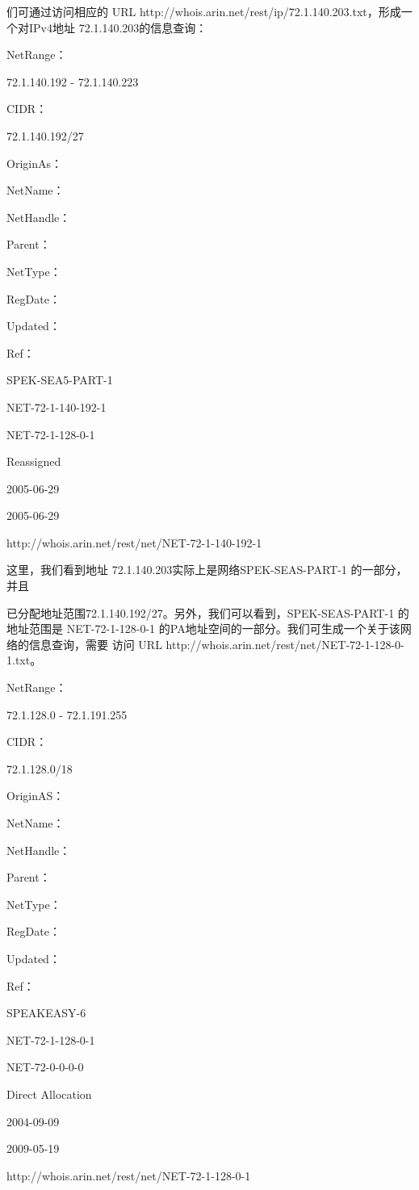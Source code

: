 们可通过访问相应的 URL http://whois.arin.net/rest/ip/72.1.140.203.txt，形成一个对IPv4地址
72.1.140.203的信息查询：

NetRange：

72.1.140.192 - 72.1.140.223

CIDR：

72.1.140.192/27

OriginAs：

NetName：

NetHandle：

Parent：

NetType：

RegDate：

Updated：

Ref：

SPEK-SEA5-PART-1

NET-72-1-140-192-1

NET-72-1-128-0-1

Reassigned

2005-06-29

2005-06-29

http://whois.arin.net/rest/net/NET-72-1-140-192-1

这里，我们看到地址 72.1.140.203实际上是网络SPEK-SEAS-PART-1 的一部分，并且

已分配地址范围72.1.140.192/27。另外，我们可以看到，SPEK-SEAS-PART-1 的地址范围是
NET-72-1-128-0-1 的PA地址空间的一部分。我们可生成一个关于该网络的信息查询，需要
访问 URL http://whois.arin.net/rest/net/NET-72-1-128-0-1.txt。

NetRange：

72.1.128.0 - 72.1.191.255

CIDR：

72.1.128.0/18

OriginAS：

NetName：

NetHandle：

Parent：

NetType：

RegDate：

Updated：

Ref：

SPEAKEASY-6

NET-72-1-128-0-1

NET-72-0-0-0-0

Direct Allocation

2004-09-09

2009-05-19

http://whois.arin.net/rest/net/NET-72-1-128-0-1

